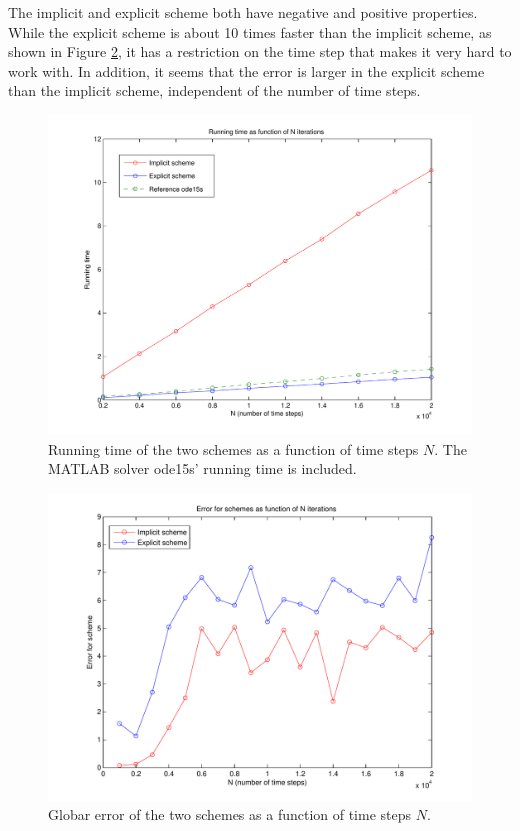 The implicit and explicit scheme both have negative and positive properties. While the explicit scheme is about 10 times faster than the implicit scheme, as shown in Figure \ref{fig:runTime}, it has a restriction on the time step that makes it very hard to work with. In addition, it seems that the error is larger in the explicit scheme than the implicit scheme, independent of the number of time steps.

\begin{figure}[H]
\centering
\includegraphics[scale=0.4]
{../PDFs/Comparisons/running_time3.pdf}
\caption{Running time of the two schemes as a function of time steps $N$. The MATLAB solver ode15s' running time is included.}
\label{fig:runTime}
\end{figure}

\begin{figure}[H]
\centering
\includegraphics[scale=0.4]
{../PDFs/Comparisons/error_compare.pdf}
\caption{Globar error of the two schemes as a function of time steps $N$. }
\label{fig:runTime}
\end{figure}


